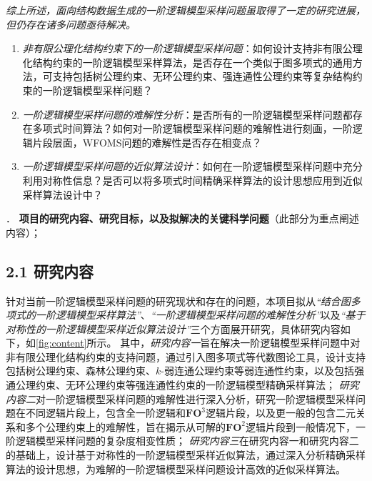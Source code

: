 \documentclass[12pt,UTF8,AutoFakeBold=3,a4paper]{ctexart} %
\newcommand{\fotwo}{\ensuremath{\mathbf{FO}^2}}
\newcommand{\fothree}{\ensuremath{\mathbf{FO}^3}}
\begin{document}
\emph{综上所述，面向结构数据生成的一阶逻辑模型采样问题虽取得了一定的研究进展，但仍存在诸多问题亟待解决。}
\begin{enumerate}
  \item \emph{非有限公理化结构约束下的一阶逻辑模型采样问题}：如何设计支持非有限公理化结构约束的一阶逻辑模型采样算法，是否存在一个类似于图多项式的通用方法，可支持包括树公理约束、无环公理约束、强连通性公理约束等复杂结构约束的一阶逻辑模型采样问题？
  \item \emph{一阶逻辑模型采样问题的难解性分析}：是否所有的一阶逻辑模型采样问题都存在多项式时间算法？如何对一阶逻辑模型采样问题的难解性进行刻画，一阶逻辑片段层面，WFOMS问题的难解性是否存在相变点？
  \item \emph{一阶逻辑模型采样问题的近似算法设计}：如何在一阶逻辑模型采样问题中充分利用对称性信息？是否可以将多项式时间精确采样算法的设计思想应用到近似采样算法设计中？
\end{enumerate}

% 

\begin{spacing}{1.1}
{\kaishu \wuhao


}
\end{spacing}
\newpage

\vspace{1.5 \baselineskip}
{\sihao \color{MsBlue} ． {\bfseries 项目的研究内容、研究目标，以及拟解决的关键科学问题}（此部分为重点阐述内容）；}

\subsection{2.1 研究内容}

针对当前一阶逻辑模型采样问题的研究现状和存在的问题，本项目拟从\emph{``结合图多项式的一阶逻辑模型采样算法''}、\emph{``一阶逻辑模型采样问题的难解性分析''}以及\emph{``基于对称性的一阶逻辑模型采样近似算法设计''}三个方面展开研究，具体研究内容如下，如\cref{fig:content}所示。
其中，\emph{研究内容一}旨在解决一阶逻辑模型采样问题中对非有限公理化结构约束的支持问题，通过引入图多项式等代数图论工具，设计支持包括树公理约束、森林公理约束、$k$-弱连通公理约束等弱连通性约束，以及包括强通公理约束、无环公理约束等强连通性约束的一阶逻辑模型精确采样算法；
\emph{研究内容二}对一阶逻辑模型采样问题的难解性进行深入分析，研究一阶逻辑模型采样问题在不同逻辑片段上，包含全一阶逻辑和\fothree{}逻辑片段，以及更一般的包含二元关系和多个公理约束上的难解性，旨在揭示从可解的\fotwo{}逻辑片段到一般情况下，一阶逻辑模型采样问题的复杂度相变性质；
\emph{研究内容三}在研究内容一和研究内容二的基础上，设计基于对称性的一阶逻辑模型采样近似算法，通过深入分析精确采样算法的设计思想，为难解的一阶逻辑模型采样问题设计高效的近似采样算法。
\end{document}
